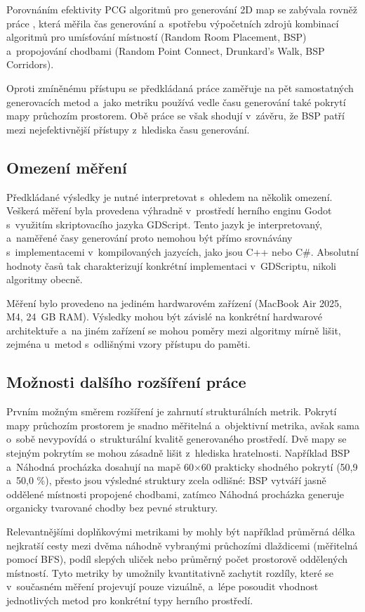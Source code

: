 \documentclass[
   program=itk,
   biblatex,
   figures=true,
   tables=true,
   glossaries,
   index
]{kidiplom}
\begin{document}
Porovnáním efektivity PCG algoritmů pro generování 2D map se zabývala rovněž práce \cite{Monaghan2019}, která měřila čas generování a~spotřebu výpočetních zdrojů kombinací algoritmů pro umísťování místností (Random Room Placement, BSP) a~propojování chodbami (Random Point Connect, Drunkard's Walk, BSP Corridors). 

Oproti zmíněnému přístupu se předkládaná práce zaměřuje na pět samostatných generovacích metod a~jako metriku používá vedle času generování také pokrytí mapy průchozím prostorem. Obě práce se však shodují v~závěru, že BSP patří mezi nejefektivnější přístupy z~hlediska času generování.

\subsection{Omezení měření}

Předkládané výsledky je nutné interpretovat s~ohledem na několik omezení. Veškerá měření byla provedena výhradně v~prostředí herního enginu Godot s~využitím skriptovacího jazyka GDScript. Tento jazyk je interpretovaný, a~naměřené časy generování proto nemohou být přímo srovnávány s~implementacemi v~kompilovaných jazycích, jako jsou C++ nebo C\#. Absolutní hodnoty časů tak charakterizují konkrétní implementaci v~GDScriptu, nikoli algoritmy obecně.

Měření bylo provedeno na jediném hardwarovém zařízení (MacBook Air 2025, M4, 24~GB RAM). Výsledky mohou být závislé na konkrétní hardwarové architektuře a~na jiném zařízení se mohou poměry mezi algoritmy mírně lišit, zejména u~metod s~odlišnými vzory přístupu do paměti.

\subsection{Možnosti dalšího rozšíření práce}
Prvním možným směrem rozšíření je zahrnutí strukturálních metrik. Pokrytí mapy průchozím prostorem je snadno měřitelná a~objektivní metrika, avšak sama o~sobě nevypovídá o~strukturální kvalitě generovaného prostředí. Dvě mapy se stejným pokrytím se mohou zásadně lišit z~hlediska hratelnosti. Například BSP a~Náhodná procházka dosahují na mapě 60$\times$60 prakticky shodného pokrytí (50,9 a~50,0 \%), přesto jsou výsledné struktury zcela odlišné: BSP vytváří jasně oddělené místnosti propojené chodbami, zatímco Náhodná procházka generuje organicky tvarované chodby bez pevné struktury.

Relevantnějšími doplňkovými metrikami by mohly být například průměrná délka nejkratší cesty mezi dvěma náhodně vybranými průchozími dlaždicemi (měřitelná pomocí BFS), podíl slepých uliček nebo průměrný počet prostorově oddělených místností. Tyto metriky by umožnily kvantitativně zachytit rozdíly, které se v~současném měření projevují pouze vizuálně, a~lépe posoudit vhodnost jednotlivých metod pro konkrétní typy herního prostředí.
\end{document}
